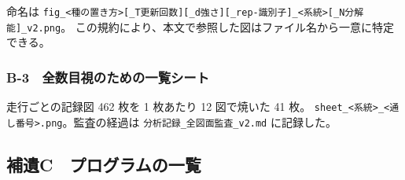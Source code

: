 \documentclass[
]{ltjsarticle}
\begin{document}
命名は
\texttt{fig\_\textless{}種の置き方\textgreater{}{[}\_T更新回数{]}{[}\_d強さ{]}{[}\_rep-識別子{]}\_\textless{}系統\textgreater{}{[}\_N分解能{]}\_v2.png}。
この規約により、本文で参照した図はファイル名から一意に特定できる。

\subsubsection{B-3　全数目視のための一覧シート}\label{b-3-ux5168ux6570ux76eeux8996ux306eux305fux3081ux306eux4e00ux89a7ux30b7ux30fcux30c8}

走行ごとの記録図 462 枚を 1 枚あたり 12 図で焼いた 41 枚。
\texttt{sheet\_\textless{}系統\textgreater{}\_\textless{}通し番号\textgreater{}.png}。監査の経過は
\texttt{分析記録\_全図面監査\_v2.md} に記録した。

\subsection{補遺C　プログラムの一覧}\label{ux88dcux907ac-ux30d7ux30edux30b0ux30e9ux30e0ux306eux4e00ux89a7}
\end{document}
